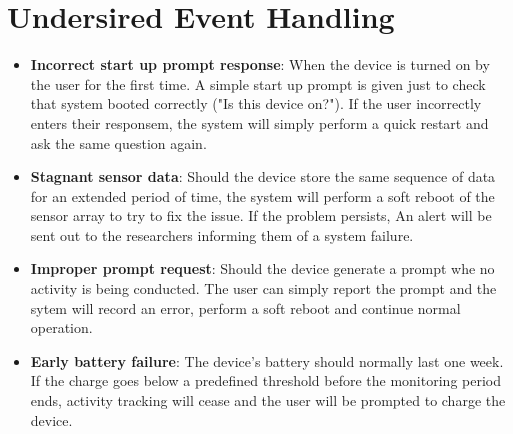 \documentclass[12pt]{article}
\begin{document}
\section{Undersired Event Handling}
\begin{itemize}
	\item \textbf{Incorrect start up prompt response}: When the device is turned on by the user for the first time. A simple start up prompt is given just to check that system booted correctly ("Is this device on?"). If the user incorrectly enters their responsem, the system will simply 				perform a quick restart and ask the same question again.

	\item \textbf{Stagnant sensor data}: Should the device store the same sequence of data for an extended period of time, the system will perform a soft reboot of the sensor array to try to fix the issue. If the problem persists, An alert will be sent out to the researchers informing them 			of a system failure.

	\item \textbf{Improper prompt request}: Should the device generate a prompt whe no activity is being conducted. The user can simply report the prompt and the sytem will record an error, perform a soft reboot and continue normal operation.

	\item \textbf{Early battery failure}: The device's battery should normally last one week. If the charge goes below a predefined threshold before the monitoring period ends, activity tracking will cease and the user will be prompted to charge the device.
\end{itemize}





\pagebreak
\end{document}

